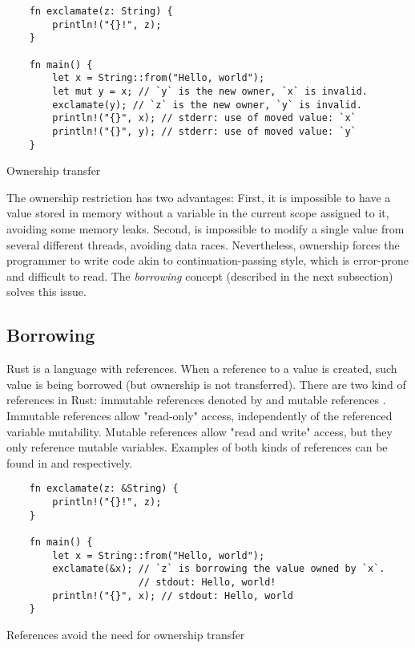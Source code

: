 \begin{listing}[ht]
	\begin{verbatim}
    fn exclamate(z: String) {
        println!("{}!", z);
    }

    fn main() {
        let x = String::from("Hello, world");
        let mut y = x; // `y` is the new owner, `x` is invalid.
        exclamate(y); // `z` is the new owner, `y` is invalid.
        println!("{}", x); // stderr: use of moved value: `x`
        println!("{}", y); // stderr: use of moved value: `y`
    }
	\end{verbatim}
  \caption{Ownership transfer}
  \label{lst:ownership}
\end{listing}

The ownership restriction has two advantages: First, it is impossible to have a
value stored in memory without a variable in the current scope assigned to it,
avoiding some memory leaks. Second, is impossible to modify a single value from
several different threads, avoiding data races. Nevertheless, ownership forces
the programmer to write code akin to continuation-passing style, which is
error-prone and difficult to read. The \textit{borrowing} concept (described in
the next subsection) solves this issue.

\subsection{Borrowing}

Rust is a language with references. When a reference to a value is created, such
value is being borrowed (but ownership is not transferred). There are two kind
of references in Rust: immutable references denoted by  and mutable
references . Immutable references allow "read-only" access,
independently of the referenced variable mutability. Mutable references allow
"read and write" access, but they only reference mutable variables. Examples of
both kinds of references can be found in  and
 respectively.

\begin{listing}[ht]
	\begin{verbatim}
    fn exclamate(z: &String) {
        println!("{}!", z);
    }

    fn main() {
        let x = String::from("Hello, world");
        exclamate(&x); // `z` is borrowing the value owned by `x`.
                       // stdout: Hello, world! 
        println!("{}", x); // stdout: Hello, world
    }
	\end{verbatim}
  \caption{References avoid the need for ownership transfer}
  \label{lst:immutable_ref}
\end{listing}

